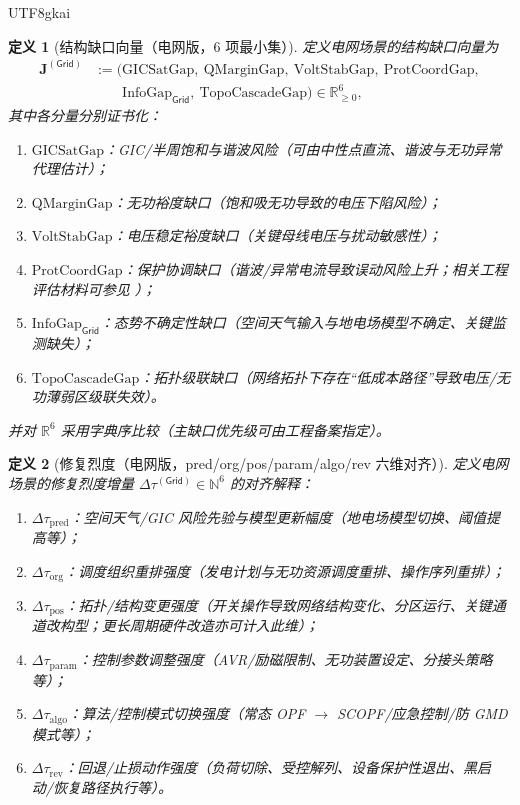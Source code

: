 \documentclass[12pt]{article}
\newtheorem{definition}{定义}[section]
\newcommand{\RR}{\mathbb{R}}
\newcommand{\NN}{\mathbb{N}}
\begin{document}
\begin{CJK*}{UTF8}{gkai}
\begin{definition}[结构缺口向量（电网版，6 项最小集）]
\label{def:grid-gap-vector}
定义电网场景的结构缺口向量为
\[
  \begin{aligned}
    \mathbf{J}^{(\mathsf{Grid})}
    &:=
    \bigl(
      \mathrm{GICSatGap},\ \mathrm{QMarginGap},\ \mathrm{VoltStabGap},\ \mathrm{ProtCoordGap},\\
      &\qquad\mathrm{InfoGap}_{\mathsf{Grid}},\ \mathrm{TopoCascadeGap}
    \bigr)\in\RR_{\ge 0}^6,
  \end{aligned}
\]
其中各分量分别证书化：
\begin{enumerate}
  \item $\mathrm{GICSatGap}$：GIC/半周饱和与谐波风险（可由中性点直流、谐波与无功异常代理估计）\cite{ref_nerc_gmd_report_2012}；
  \item $\mathrm{QMarginGap}$：无功裕度缺口（饱和吸无功导致的电压下陷风险）\cite{ref_nerc_gmd_planning_guide_2013}；
  \item $\mathrm{VoltStabGap}$：电压稳定裕度缺口（关键母线电压与扰动敏感性）；
  \item $\mathrm{ProtCoordGap}$：保护协调缺口（谐波/异常电流导致误动风险上升；相关工程评估材料可参见 \cite{ref_iso_ne_gmd_2026_na_sow}）；
  \item $\mathrm{InfoGap}_{\mathsf{Grid}}$：态势不确定性缺口（空间天气输入与地电场模型不确定、关键监测缺失）；
  \item $\mathrm{TopoCascadeGap}$：拓扑级联缺口（网络拓扑下存在“低成本路径”导致电压/无功薄弱区级联失效）。
\end{enumerate}
并对 $\RR^6$ 采用字典序比较（主缺口优先级可由工程备案指定）。
\end{definition}

\begin{definition}[修复烈度（电网版，pred/org/pos/param/algo/rev 六维对齐）]
\label{def:grid-tau}
定义电网场景的修复烈度增量 $\Delta\tau^{(\mathsf{Grid})}\in\NN^6$ 的对齐解释：
\begin{enumerate}
  \item $\Delta\tau_{\mathrm{pred}}$：空间天气/GIC 风险先验与模型更新幅度（地电场模型切换、阈值提高等）；
  \item $\Delta\tau_{\mathrm{org}}$：调度组织重排强度（发电计划与无功资源调度重排、操作序列重排）；
  \item $\Delta\tau_{\mathrm{pos}}$：拓扑/结构变更强度（开关操作导致网络结构变化、分区运行、关键通道改构型；更长周期硬件改造亦可计入此维）；
  \item $\Delta\tau_{\mathrm{param}}$：控制参数调整强度（AVR/励磁限制、无功装置设定、分接头策略等）；
  \item $\Delta\tau_{\mathrm{algo}}$：算法/控制模式切换强度（常态 OPF $\to$ SCOPF/应急控制/防 GMD 模式等）；
  \item $\Delta\tau_{\mathrm{rev}}$：回退/止损动作强度（负荷切除、受控解列、设备保护性退出、黑启动/恢复路径执行等）。
\end{enumerate}
\end{definition}


\end{CJK*}
\end{document}
